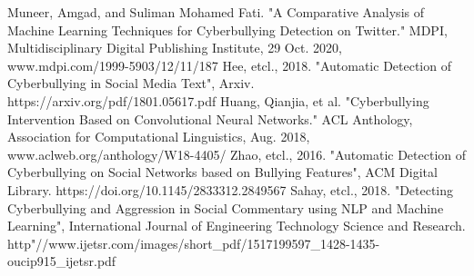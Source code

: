 \documentclass[conference]{IEEEtran}
\begin{document}
\begin{thebibliography}{00}
 Muneer, Amgad, and Suliman Mohamed Fati. "A Comparative Analysis of Machine Learning Techniques for Cyberbullying Detection on Twitter." MDPI, Multidisciplinary Digital Publishing Institute, 29 Oct. 2020, www.mdpi.com/1999-5903/12/11/187
 Hee, etcl., 2018. "Automatic Detection of Cyberbullying in Social Media Text", Arxiv. https://arxiv.org/pdf/1801.05617.pdf
 Huang, Qianjia, et al. "Cyberbullying Intervention Based on Convolutional Neural Networks." ACL Anthology, Association for Computational Linguistics, Aug. 2018, www.aclweb.org/anthology/W18-4405/
 Zhao, etcl., 2016. "Automatic Detection of Cyberbullying on Social Networks based on Bullying Features", ACM Digital Library. https://doi.org/10.1145/2833312.2849567
 Sahay, etcl., 2018. "Detecting Cyberbullying and Aggression in Social Commentary using NLP and Machine Learning", International Journal of Engineering Technology Science and Research. http"//www.ijetsr.com/images/short\_pdf/1517199597\_1428-1435-oucip915\_ijetsr.pdf
\end{thebibliography}
\vspace{12pt}
\end{document}
